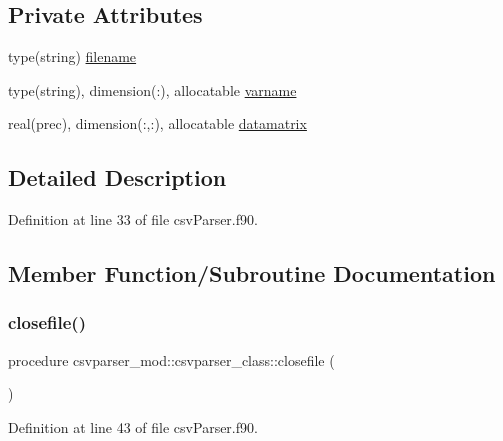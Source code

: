 \subsection*{Private Attributes}
\begin{DoxyCompactItemize}
\item 
type(string) \mbox{\hyperlink{structcsvparser__mod_1_1csvparser__class_aa3632225cd36ea1ad9e8c0493a218886}{filename}}
\item 
type(string), dimension(\+:), allocatable \mbox{\hyperlink{structcsvparser__mod_1_1csvparser__class_acad38d37d73d0cb6ca80f98cde3d56b4}{varname}}
\item 
real(prec), dimension(\+:,\+:), allocatable \mbox{\hyperlink{structcsvparser__mod_1_1csvparser__class_afb06725049484011f39d9183adc9d192}{datamatrix}}
\end{DoxyCompactItemize}


\subsection{Detailed Description}


Definition at line 33 of file csv\+Parser.\+f90.



\subsection{Member Function/\+Subroutine Documentation}
\mbox{\label{structcsvparser__mod_1_1csvparser__class_a1daa0b05831e325af862044831d5aade}} 
\subsubsection{\texorpdfstring{closefile()}{closefile()}}
{\footnotesize\ttfamily procedure csvparser\+\_\+mod\+::csvparser\+\_\+class\+::closefile (\begin{DoxyParamCaption}{ }\end{DoxyParamCaption})\hspace{0.3cm}{\ttfamily [private]}}



Definition at line 43 of file csv\+Parser.\+f90.

